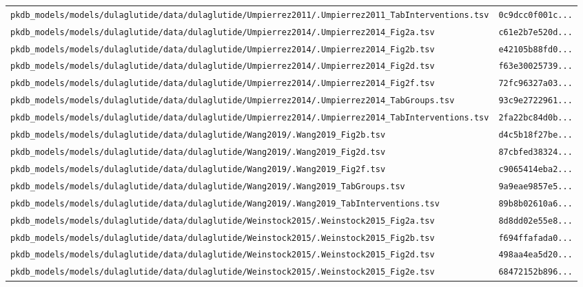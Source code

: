 \documentclass{article}
\begin{document}
\begin{longtable}{ll}
\texttt{pkdb\_models/models/dulaglutide/data/dulaglutide/Umpierrez2011/.Umpierrez2011\_TabInterventions.tsv} & \texttt{0c9dcc0f001c...} \\
\texttt{pkdb\_models/models/dulaglutide/data/dulaglutide/Umpierrez2014/.Umpierrez2014\_Fig2a.tsv} & \texttt{c61e2b7e520d...} \\
\texttt{pkdb\_models/models/dulaglutide/data/dulaglutide/Umpierrez2014/.Umpierrez2014\_Fig2b.tsv} & \texttt{e42105b88fd0...} \\
\texttt{pkdb\_models/models/dulaglutide/data/dulaglutide/Umpierrez2014/.Umpierrez2014\_Fig2d.tsv} & \texttt{f63e30025739...} \\
\texttt{pkdb\_models/models/dulaglutide/data/dulaglutide/Umpierrez2014/.Umpierrez2014\_Fig2f.tsv} & \texttt{72fc96327a03...} \\
\texttt{pkdb\_models/models/dulaglutide/data/dulaglutide/Umpierrez2014/.Umpierrez2014\_TabGroups.tsv} & \texttt{93c9e2722961...} \\
\texttt{pkdb\_models/models/dulaglutide/data/dulaglutide/Umpierrez2014/.Umpierrez2014\_TabInterventions.tsv} & \texttt{2fa22bc84d0b...} \\
\texttt{pkdb\_models/models/dulaglutide/data/dulaglutide/Wang2019/.Wang2019\_Fig2b.tsv} & \texttt{d4c5b18f27be...} \\
\texttt{pkdb\_models/models/dulaglutide/data/dulaglutide/Wang2019/.Wang2019\_Fig2d.tsv} & \texttt{87cbfed38324...} \\
\texttt{pkdb\_models/models/dulaglutide/data/dulaglutide/Wang2019/.Wang2019\_Fig2f.tsv} & \texttt{c9065414eba2...} \\
\texttt{pkdb\_models/models/dulaglutide/data/dulaglutide/Wang2019/.Wang2019\_TabGroups.tsv} & \texttt{9a9eae9857e5...} \\
\texttt{pkdb\_models/models/dulaglutide/data/dulaglutide/Wang2019/.Wang2019\_TabInterventions.tsv} & \texttt{89b8b02610a6...} \\
\texttt{pkdb\_models/models/dulaglutide/data/dulaglutide/Weinstock2015/.Weinstock2015\_Fig2a.tsv} & \texttt{8d8dd02e55e8...} \\
\texttt{pkdb\_models/models/dulaglutide/data/dulaglutide/Weinstock2015/.Weinstock2015\_Fig2b.tsv} & \texttt{f694ffafada0...} \\
\texttt{pkdb\_models/models/dulaglutide/data/dulaglutide/Weinstock2015/.Weinstock2015\_Fig2d.tsv} & \texttt{498aa4ea5d20...} \\
\texttt{pkdb\_models/models/dulaglutide/data/dulaglutide/Weinstock2015/.Weinstock2015\_Fig2e.tsv} & \texttt{68472152b896...} \\

\end{longtable}
\end{document}
